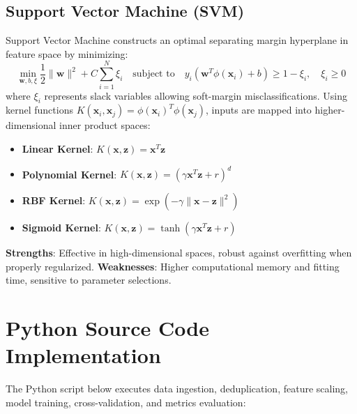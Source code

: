 \documentclass[12pt,a4paper]{article}
\begin{document}
\subsection{Support Vector Machine (SVM)}
Support Vector Machine constructs an optimal separating margin hyperplane in feature space by minimizing:
\begin{equation}
\min_{\mathbf{w}, b, \xi} \frac{1}{2} \|\mathbf{w}\|^2 + C \sum_{i=1}^N \xi_i \quad \text{subject to} \quad y_i(\mathbf{w}^T \phi(\mathbf{x}_i) + b) \ge 1 - \xi_i, \quad \xi_i \ge 0
\end{equation}
where $\xi_i$ represents slack variables allowing soft-margin misclassifications. Using kernel functions $K(\mathbf{x}_i, \mathbf{x}_j) = \phi(\mathbf{x}_i)^T \phi(\mathbf{x}_j)$, inputs are mapped into higher-dimensional inner product spaces:
\begin{itemize}[noitemsep]
    \item \textbf{Linear Kernel}: $K(\mathbf{x}, \mathbf{z}) = \mathbf{x}^T \mathbf{z}$
    \item \textbf{Polynomial Kernel}: $K(\mathbf{x}, \mathbf{z}) = (\gamma \mathbf{x}^T \mathbf{z} + r)^d$
    \item \textbf{RBF Kernel}: $K(\mathbf{x}, \mathbf{z}) = \exp(-\gamma \|\mathbf{x} - \mathbf{z}\|^2)$
    \item \textbf{Sigmoid Kernel}: $K(\mathbf{x}, \mathbf{z}) = \tanh(\gamma \mathbf{x}^T \mathbf{z} + r)$
\end{itemize}

\textbf{Strengths}: Effective in high-dimensional spaces, robust against overfitting when properly regularized.  
\textbf{Weaknesses}: Higher computational memory and fitting time, sensitive to parameter selections.

\section{Python Source Code Implementation}
The Python script below executes data ingestion, deduplication, feature scaling, model training, cross-validation, and metrics evaluation:
\end{document}
